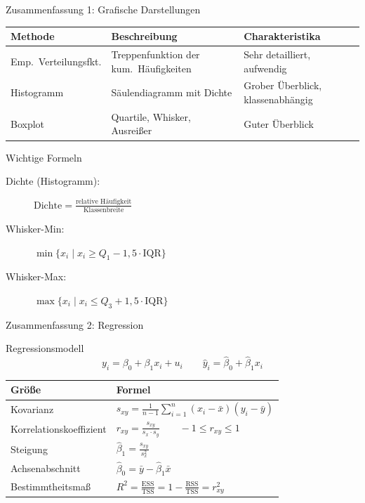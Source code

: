 \documentclass[aspectratio=169,11pt]{beamer}
\begin{document}

\begin{frame}{Zusammenfassung 1: Grafische Darstellungen}
  \begin{center}
    \small
    \renewcommand{\arraystretch}{1.4}
    \begin{tabular}{l|>{\raggedright\arraybackslash}p{4.9cm}|>{\raggedright\arraybackslash}p{4.6cm}}
      \toprule
      \textbf{Methode} & \textbf{Beschreibung} & \textbf{Charakteristika} \\
      \midrule
      Emp.\ Verteilungsfkt. & Treppenfunktion der kum.\ Häufigkeiten & Sehr detailliert, aufwendig \\
      Histogramm & Säulendiagramm mit Dichte & Grober Überblick, klassenabhängig \\
      Boxplot & Quartile, Whisker, Ausreißer & Guter Überblick \\
      \bottomrule
    \end{tabular}
  \end{center}

  \begin{block}{Wichtige Formeln}
    \begin{description}
      \item[Dichte (Histogramm):] $\text{Dichte} = \frac{\text{relative Häufigkeit}}{\text{Klassenbreite}}$
      \item[Whisker-Min:] $\min\{x_i \mid x_i \geq Q_1 - 1{,}5 \cdot \text{IQR}\}$
      \item[Whisker-Max:] $\max\{x_i \mid x_i \leq Q_3 + 1{,}5 \cdot \text{IQR}\}$
    \end{description}
  \end{block}
\end{frame}

\begin{frame}{Zusammenfassung 2: Regression}
  \begin{block}{Regressionsmodell}
    \[ y_i = \beta_0 + \beta_1 x_i + u_i \qquad \hat{y}_i = \hat{\beta}_0 + \hat{\beta}_1 x_i \]
  \end{block}

  \begin{center}
    \renewcommand{\arraystretch}{1.4}
    \begin{tabular}{l|l}
      \toprule
      \textbf{Größe} & \textbf{Formel} \\
      \midrule
      Kovarianz & $s_{xy} = \frac{1}{n-1}\sum_{i=1}^{n}(x_i - \bar{x})(y_i - \bar{y})$ \\[4pt]
      Korrelationskoeffizient & $r_{xy} = \frac{s_{xy}}{s_x \cdot s_y} \qquad -1 \leq r_{xy} \leq 1$ \\[4pt]
      Steigung & $\hat{\beta}_1 = \frac{s_{xy}}{s_x^2}$ \\[4pt]
      Achsenabschnitt & $\hat{\beta}_0 = \bar{y} - \hat{\beta}_1 \bar{x}$ \\[4pt]
      Bestimmtheitsmaß & $R^2 = \frac{\text{ESS}}{\text{TSS}} = 1 - \frac{\text{RSS}}{\text{TSS}} = r_{xy}^2$ \\
      \bottomrule
    \end{tabular}
  \end{center}
\end{frame}
\end{document}
